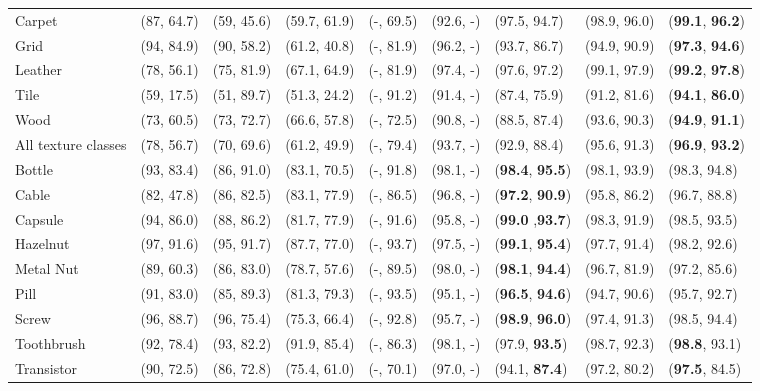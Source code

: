 \documentclass[a4paper,conference]{IEEEtran}
\begin{document}
\begin{table*}[!ht]
{\begin{tabular}{|p{2.3cm}||p{1.3cm}|p{1.2cm}|p{1.4cm}||p{1.2cm}|p{1.3cm}|p{1.4cm}||p{1.4cm}|p{1.6cm}|}
Carpet & (87, 64.7)  &  (59, 45.6) &(59.7, 61.9)& (-, 69.5) & (92.6, -) & (97.5, 94.7) &(98.9, 96.0) & (\textbf{99.1}, \textbf{96.2}) \\ 
Grid & (94, 84.9) & (90, 58.2) &(61.2, 40.8)& (-, 81.9)  & (96.2, -) & (93.7, 86.7)  & (94.9, 90.9)  &(\textbf{97.3}, \textbf{94.6}) \\
Leather & (78, 56.1)  & (75, 81.9) &(67.1, 64.9)& (-, 81.9) &(97.4, -) & (97.6, 97.2)  & (99.1, 97.9) & (\textbf{99.2},  \textbf{97.8})\\ 
Tile & (59, 17.5)  & (51, 89.7) &(51.3, 24.2) & (-, 91.2) &(91.4, -) & (87.4, 75.9) & (91.2, 81.6) &(\textbf{94.1}, \textbf{86.0})  \\  
Wood & (73, 60.5) & (73, 72.7) & (66.6, 57.8) & (-, 72.5)  &(90.8, -) & (88.5, 87.4) & (93.6, 90.3)  & (\textbf{94.9}, \textbf{91.1}) \\ \hline
All texture classes & (78, 56.7) &  (70, 69.6)  &(61.2, 49.9)& (-, 79.4) &(93.7, -) & (92.9, 88.4) &(95.6, 91.3) & (\textbf{96.9}, \textbf{93.2}) \\ \hline 
Bottle & (93, 83.4)  & (86, 91.0)  &(83.1, 70.5)& (-, 91.8) &(98.1, -)&  (\textbf{98.4}, \textbf{95.5}) & (98.1, 93.9) & (98.3, 94.8) 
\\ Cable & (82, 47.8) & (86, 82.5) & (83.1, 77.9)&(-, 86.5) &(96.8, -) & (\textbf{97.2}, \textbf{90.9}) & (95.8, 86.2)& (96.7, 88.8)\\
Capsule  & (94, 86.0) & (88, 86.2) &(81.7, 77.9)& (-, 91.6) &(95.8, -) &  (\textbf{99.0} ,\textbf{93.7}) & (98.3, 91.9) & (98.5, 93.5)\\ 
Hazelnut & (97, 91.6) & (95, 91.7) &(87.7, 77.0)& (-, 93.7)& (97.5, -) &  (\textbf{99.1}, \textbf{95.4}) & (97.7, 91.4)& (98.2, 92.6)\\ 
Metal Nut& (89, 60.3) & (86, 83.0) &(78.7, 57.6)& (-, 89.5) &(98.0, -) & (\textbf{98.1}, \textbf{94.4})& (96.7, 81.9)& (97.2, 85.6)\\
Pill & (91, 83.0) & (85, 89.3) &(81.3, 79.3)& (-, 93.5) & (95.1, -) &   (\textbf{96.5}, \textbf{94.6}) & (94.7, 90.6) &  (95.7, 92.7)\\
Screw & (96, 88.7) & (96, 75.4) & (75.3, 66.4) &(-, 92.8) &(95.7, -)&   (\textbf{98.9}, \textbf{96.0})&(97.4, 91.3)& (98.5, 94.4)\\  
Toothbrush & (92, 78.4) & (93, 82.2) &(91.9, 85.4)& (-, 86.3) & (98.1, -)&  (97.9, \textbf{93.5})&(98.7, 92.3) &(\textbf{98.8}, 93.1)\\ 
Transistor & (90, 72.5) & (86, 72.8) &(75.4, 61.0)& (-, 70.1) & (97.0, -) &  (94.1, \textbf{87.4}) &(97.2, 80.2)  &(\textbf{97.5}, 84.5) \\  

\end{tabular}}
\end{table*}
\end{document}
